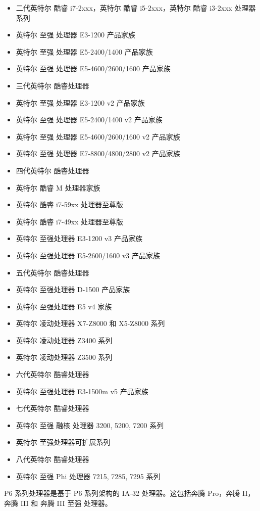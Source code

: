 \begin{itemize}
	\item 二代英特尔 酷睿 i7-2xxx，英特尔 酷睿 i5-2xxx，英特尔 酷睿 i3-2xxx 处理器系列
	\item 英特尔 至强 处理器 E3-1200 产品家族
	\item 英特尔 至强 处理器 E5-2400/1400 产品家族
	\item 英特尔 至强 处理器 E5-4600/2600/1600 产品家族
	\item 三代英特尔 酷睿处理器
	\item 英特尔 至强 处理器 E3-1200 v2 产品家族
	\item 英特尔 至强 处理器 E5-2400/1400 v2 产品家族
	\item 英特尔 至强 处理器 E5-4600/2600/1600 v2 产品家族
	\item 英特尔 至强 处理器 E7-8800/4800/2800 v2 产品家族
	\item 四代英特尔 酷睿处理器
	\item 英特尔 酷睿 M 处理器家族
	\item 英特尔 酷睿 i7-59xx 处理器至尊版
	\item 英特尔 酷睿 i7-49xx 处理器至尊版
	\item 英特尔 至强处理器 E3-1200 v3 产品家族
	\item 英特尔 至强处理器 E5-2600/1600 v3 产品家族
	\item 五代英特尔 酷睿处理器
	\item 英特尔 至强处理器 D-1500 产品家族
	\item 英特尔 至强处理器 E5 v4 家族
	\item 英特尔 凌动处理器 X7-Z8000 和 X5-Z8000 系列
	\item 英特尔 凌动处理器 Z3400 系列
	\item 英特尔 凌动处理器 Z3500 系列
	\item 六代英特尔 酷睿处理器
	\item 英特尔 至强处理器 E3-1500m v5 产品家族
	\item 七代英特尔 酷睿处理器
	\item 英特尔 至强 融核 处理器 3200, 5200, 7200 系列
	\item 英特尔 至强处理器可扩展系列
	\item 八代英特尔 酷睿处理器
	\item 英特尔 至强 Phi 处理器 7215, 7285, 7295 系列
\end{itemize}

\newpage

P6 系列处理器是基于 P6 系列架构的 IA-32 处理器。这包括奔腾 Pro，奔腾 II，奔腾 III 和 奔腾 III 至强 处理器。

